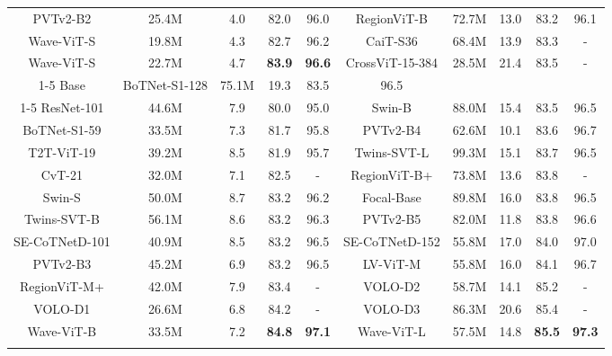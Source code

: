 \documentclass[runningheads]{llncs}
\begin{document}
\begin{table*}[!tb]
\begin{tabular}{c|c|c|cc|c|cc|cc}
PVTv2-B2 \cite{wang2021pvtv2}                & 25.4M & 4.0 & 82.0 & 96.0 & RegionViT-B \cite{chen2021regionvit}         & 72.7M & 13.0 & 83.2 & 96.1  \\
Wave-ViT-S                              & 19.8M & 4.3 & 82.7 & 96.2 & CaiT-S36 \cite{touvron2021going}             & 68.4M  & 13.9 & 83.3 & -     \\
Wave-ViT-S                   & 22.7M & 4.7 & \textbf{83.9} & \textbf{96.6} & CrossViT-15-384 \cite{chen2021crossvit}      & 28.5M & 21.4 & 83.5 & -     \\ \cline{1-5}
\multicolumn{5}{c|} {Base}                                        & BoTNet-S1-128 \cite{srinivas2021bottleneck}  & 75.1M & 19.3 & 83.5 & 96.5  \\  \cline{1-5}
ResNet-101 \cite{he2016deep}                 & 44.6M & 7.9 & 80.0 & 95.0 & Swin-B  \cite{liu2021swin}                   & 88.0M & 15.4 & 83.5 & 96.5  \\
BoTNet-S1-59 \cite{srinivas2021bottleneck}   & 33.5M & 7.3 & 81.7 & 95.8 & PVTv2-B4 \cite{wang2021pvtv2}                & 62.6M & 10.1 & 83.6 & 96.7  \\
T2T-ViT-19 \cite{yuan2021tokens}             & 39.2M & 8.5 & 81.9 & 95.7 & Twins-SVT-L \cite{chu2021twins}              & 99.3M & 15.1 & 83.7 & 96.5  \\
CvT-21 \cite{wu2021cvt}                      & 32.0M & 7.1 & 82.5 & -    & RegionViT-B+ \cite{chen2021regionvit}        & 73.8M & 13.6 & 83.8 & -     \\
Swin-S  \cite{liu2021swin}                   & 50.0M & 8.7 & 83.2 & 96.2 & Focal-Base \cite{yang2021focal}              & 89.8M & 16.0 & 83.8 & 96.5  \\
Twins-SVT-B \cite{chu2021twins}              & 56.1M & 8.6 & 83.2 & 96.3 & PVTv2-B5 \cite{wang2021pvtv2}                & 82.0M & 11.8 & 83.8 & 96.6  \\
SE-CoTNetD-101 \cite{li2022contextual}     & 40.9M & 8.5   & 83.2 & 96.5 & SE-CoTNetD-152 \cite{li2022contextual} & 55.8M & 17.0 & 84.0 & 97.0 \\
PVTv2-B3 \cite{wang2021pvtv2}                & 45.2M & 6.9 & 83.2 & 96.5 & LV-ViT-M \cite{jiang2021all}         & 55.8M & 16.0 & 84.1 & 96.7  \\
RegionViT-M+ \cite{chen2021regionvit}        & 42.0M & 7.9 & 83.4 & -    & VOLO-D2 \cite{yuan2021volo}          & 58.7M & 14.1 & 85.2 & -     \\
VOLO-D1  \cite{yuan2021volo}         & 26.6M & 6.8 & 84.2 & - & VOLO-D3 \cite{yuan2021volo}          & 86.3M & 20.6 & 85.4 & -     \\
Wave-ViT-B                                   & 33.5M & 7.2 & \textbf{84.8} & \textbf{97.1} & Wave-ViT-L   & 57.5M & 14.8 & \textbf{85.5} & \textbf{97.3}  \\
\Xhline{2\arrayrulewidth}
\end{tabular}
\label{table:imagenet}
\vspace{-0.3in}
\end{table*}
\end{document}
